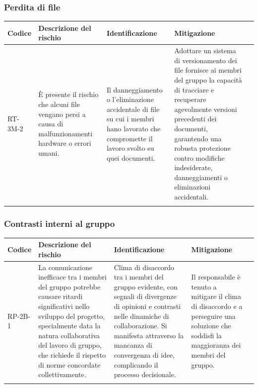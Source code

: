 \documentclass{article}
\begin{document}
\newpage
\subsubsection{Perdita di file}
\begin{table}[h]
    \centering
    \begin{tabularx}{\textwidth}{l>{\RaggedRight}X>{\RaggedRight}X>{\RaggedRight}X>{\RaggedRight}X}
    \toprule
    \rowcolor{gray!50}
    \textbf{Codice} & \textbf{Descrizione del rischio} & \textbf{Identificazione} & \textbf{Mitigazione} \\
    \midrule
    \addlinespace 
    RT-3M-2 & 
    È presente il rischio che alcuni file vengano persi a causa di malfunzionamenti hardware o errori umani. &
    Il danneggiamento o l'eliminazione accidentale di file su cui i membri hano lavorato che compromette il lavoro svolto su quei documenti. &
    Adottare un sistema di versionamento dei file fornisce ai membri del gruppo la capacità di tracciare e recuperare agevolmente versioni precedenti dei documenti, garantendo una robusta protezione contro modifiche indesiderate, danneggiamenti o eliminazioni accidentali.\\
    \bottomrule
    \addlinespace 
    \end{tabularx}
\end{table}

\subsubsection{Contrasti interni al gruppo}
\begin{table}[h]
    \centering
    \begin{tabularx}{\textwidth}{l>{\RaggedRight}X>{\RaggedRight}X>{\RaggedRight}X>{\RaggedRight}X}
    \toprule
    \rowcolor{gray!50}
    \textbf{Codice} & \textbf{Descrizione del rischio} & \textbf{Identificazione} & \textbf{Mitigazione} \\
    \midrule
    \addlinespace 
    RP-2B-1 & 
    La comunicazione inefficace tra i membri del gruppo potrebbe causare ritardi significativi nello sviluppo del progetto, specialmente data la natura collaborativa del lavoro di gruppo, che richiede il rispetto di norme concordate collettivamente.& 
    Clima di disaccordo tra i membri del gruppo evidente, con segnali di divergenze di opinioni e contrasti nelle dinamiche di collaborazione. Si manifesta attraverso la mancanza di convergenza di idee, complicando il processo decisionale. &
    Il responsabile è tenuto a mitigare il clima di disaccordo e a perseguire una soluzione che soddisfi la maggioranza dei membri del gruppo. \\
    \bottomrule
    \addlinespace 
    \end{tabularx}
\end{table}
\end{document}

